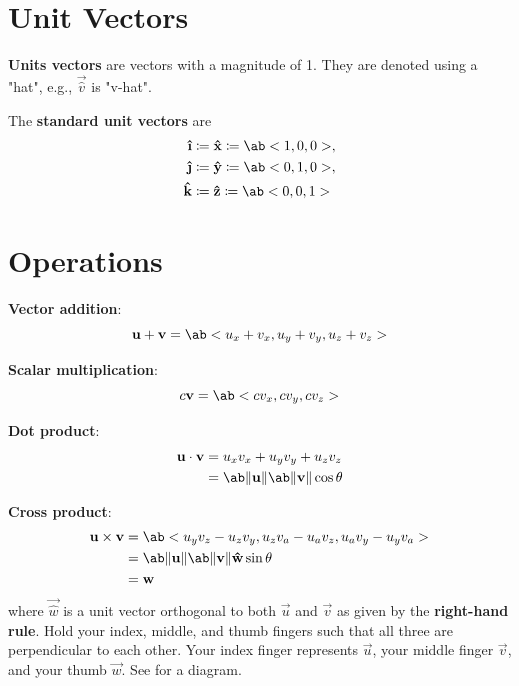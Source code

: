 \section{Unit Vectors} \label{sec:unit-vectors}

\textbf{Units vectors} are vectors with a magnitude of 1.
They are denoted using a "hat", e.g., \(\vec{\hat{v}}\) is "v-hat".

The \textbf{standard unit vectors} are
\begin{equation}
    \begin{aligned}
        \vec{\iHat} &\coloneq \vec{\hat{x}} \coloneq \ab< 1, 0, 0 >, \\
        \vec{\jHat} &\coloneq \vec{\hat{y}} \coloneq \ab< 0, 1, 0 >, \\
        \vec{\hat{k}} &\coloneq \vec{\hat{z}} \coloneq \ab< 0, 0, 1 >
    \end{aligned}
\end{equation}
\vfil

\section{Operations}

\textbf{Vector addition}:
\begin{equation}
    \vec{u} + \vec{v} = \ab< u_x + v_x, u_y + v_y, u_z + v_z >
\end{equation}

\textbf{Scalar multiplication}:
\begin{equation}
    c \vec{v} = \ab< c v_x, c v_y, c v_z >
\end{equation}

\textbf{Dot product}:
\begin{equation}
    \begin{aligned}
        \vec{u} \cdot \vec{v} &= u_x v_x + u_y v_y + u_z v_z \\
        &= \ab\|\vec{u}\|\ab\|\vec{v}\|\cos\theta
    \end{aligned}
\end{equation}

\textbf{Cross product}:
\begin{equation}
    \begin{aligned}
        \vec{u} \times \vec{v}
        &= \ab< u_y v_z - u_z v_y, u_z v_a - u_a v_z, u_a v_y - u_y v_a > \\
        &= \ab\|\vec{u}\|\ab\|\vec{v}\|\vec{\hat{w}} \sin\theta \\
        &= \vec{w}
    \end{aligned}
\end{equation}
where \(\vec{\hat{w}}\) is a unit vector orthogonal to both
\(\vec{u}\) and \(\vec{v}\)
as given by the \textbf{right-hand rule}.
Hold your index, middle, and thumb fingers such that all three are
perpendicular to each other.
Your index finger represents \(\vec{u}\), your middle finger \(\vec{v}\),
and your thumb \(\vec{w}\).
See  for a diagram.


